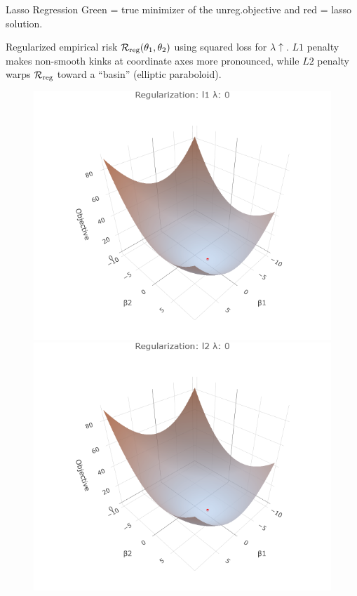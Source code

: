 \documentclass[11pt,compress,t,notes=noshow, xcolor=table]{beamer}
\begin{document}
\begin{vbframe}{Lasso Regression}
Green  = true minimizer of the unreg.objective and red = lasso solution.

\framebreak

Regularized empirical risk $\mathcal{R}_{\text{reg}}(\theta_1,\theta_2)$ using squared loss for $\lambda \uparrow$. $L1$ penalty makes non-smooth kinks at coordinate axes more pronounced, while $L2$ penalty warps $\mathcal{R}_{\text{reg}}$ toward a ``basin'' (elliptic paraboloid). 
 
\begin{figure}
    \begin{minipage}{0.32\linewidth}
        \centerline{\includegraphics[width=\textwidth]{figure/reg_surfaces_l1_lam0.png}}
        \centerline{\includegraphics[width=\textwidth]{figure/reg_surfaces_l2_lam0.png}}

\end{minipage}
\end{figure}
\end{vbframe}
\end{document}
